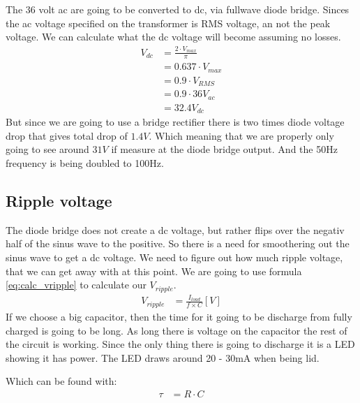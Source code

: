 The 36 volt ac are going to be converted to dc, via fullwave diode bridge. Sinces the ac voltage specified on the transformer is RMS voltage, an not the peak voltage. We can calculate what the dc voltage will become assuming no losses.
\begin{align} \label{eq:calc_vdc}
V_{ dc } &= \frac{ 2 \cdot V_{ max } }{ \pi } \\
         &= 0.637 \cdot V_{ max } \\
         &= 0.9 \cdot V_{ RMS } \\
         &= 0.9 \cdot 36 V_{ac} \nonumber \\
         &= 32.4 V_{ dc } \nonumber
\end{align}
But since we are going to use a bridge rectifier there is two times diode voltage drop that gives total drop of \(1.4V\). Which meaning that we are properly only going to see around \( 31V \) if measure at the diode bridge output. And the 50Hz frequency is being doubled to 100Hz.

\subsection{Ripple voltage}
The diode bridge does not create a dc voltage, but rather flips over the negativ half of the sinus wave to the positive. So there is a need for smoothering out the sinus wave to get a dc voltage. 
We need to figure out how much ripple voltage, that we can get away with at this point. We are going to use formula \ref{eq:calc_vripple} to calculate our $V_{ripple}$.
\begin{align}\label{eq:calc_vripple}
V_{ ripple } &= \frac{ I_{ load } }{ f \times C } [V]
\end{align}
If we choose a big capacitor, then the time for it going to be discharge from fully charged is going to be long. As long there is voltage on the capacitor the rest of the circuit is working. Since the only thing there is going to discharge it is a LED showing it has power. The LED draws around 20 - 30mA when being lid.

Which can be found with:
\begin{align}
\tau &= R \cdot C
\end{align}

